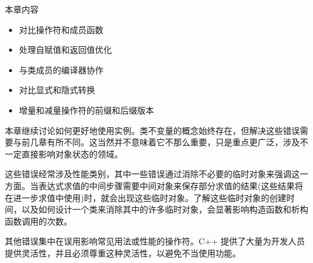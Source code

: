 本章内容

\begin{itemize}
\item
对比操作符和成员函数

\item
处理自赋值和返回值优化

\item
与类成员的编译器协作

\item
对比显式和隐式转换

\item
增量和减量操作符的前缀和后缀版本
\end{itemize}

本章继续讨论如何更好地使用实例。类不变量的概念始终存在，但解决这些错误需要与前几章有所不同。这当然并不意味着它不那么重要，只是重点更广泛，涉及不一定直接影响对象状态的领域。

这些错误经常涉及性能类别，其中一些错误通过消除不必要的临时对象来强调这一方面。当表达式求值的中间步骤需要中间对象来保存部分求值的结果(这些结果将在进一步求值中使用)时，就会出现这些临时对象。了解这些临时对象的创建时间，以及如何设计一个类来消除其中的许多临时对象，会显著影响构造函数和析构函数调用的次数。

其他错误集中在误用影响常见用法或性能的操作符。C++ 提供了大量为开发人员提供灵活性，并且必须尊重这种灵活性，以避免不当使用功能。
